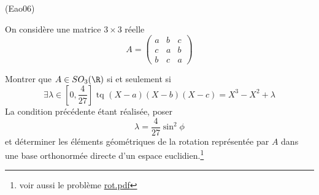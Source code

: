 \begin{tiny}(Eao06)\end{tiny}
On considère une matrice $3\times3$ réelle
\begin{displaymath}
 A=
\begin{pmatrix}
a & b & c \\
c & a & b \\
b & c & a 
\end{pmatrix}
\end{displaymath}

Montrer que $A\in SO_{3}(\R)$ si et seulement si
\begin{displaymath}
 \exists \lambda \in \left[ 0,\frac{4}{27}\right] \text{ tq }
  (X-a)(X-b)(X-c)=X^{3}-X^{2}+\lambda 
\end{displaymath}
La condition précédente étant réalisée, poser 
\begin{displaymath}
 \lambda =\frac{4}{27}\sin ^{2}\phi
\end{displaymath}
et déterminer les éléments géométriques de la rotation représentée par $A$ dans une
base orthonormée directe d'un espace euclidien.\footnote{voir aussi le problème \href{\baseurl devoirs_nicolair/Arot.pdf}{rot.pdf}}

